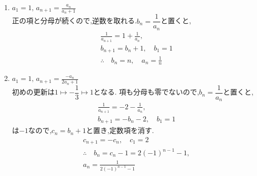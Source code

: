     \noindent{}\par\nobreak
    \begin{enumerate}[label=(\arabic*),parsep=3pt,format=\bookitemlink{example-reciprocal-1}{solution}{problem}]
      \item $\displaystyle a_1=1,\, a_{n+1}=\frac{a_n}{a_n+1}$\\
            正の項と分母が続くので,逆数を取れる.$b_n=\dfrac{1}{a_n}$と置くと,
            \begin{align*}
              &\frac{1}{a_{n+1}}=1+\frac{1}{a_n},\\
              &b_{n+1}=b_n+1,\quad b_1=1\\
              &\therefore \quad b_n=n,\quad a_n=\frac1n
            \end{align*}
      \item $\displaystyle a_1=1,\, a_{n+1}=\frac{-a_n}{2a_n+1}$\\
            初めの更新は$1\longmapsto-\dfrac{1}{3}\longmapsto1$となる.
            項も分母も零でないので,$b_n=\dfrac{1}{a_n}$と置くと,
            \begin{align*}
              &\frac{1}{a_{n+1}}=-2-\frac{1}{a_n},\\
              &b_{n+1}=-b_n-2,\quad b_1=1
            \end{align*}
            は$-1$なので,$c_n=b_n+1$と置き,定数項を消す.
            \begin{align*}
              &c_{n+1}=-c_n,\quad c_1=2\\
              &\therefore \quad b_n=c_n-1=2(-1)^{n-1}-1,\\
              &a_n=\frac{1}{2(-1)^{n-1}-1}
            \end{align*}
    \end{enumerate}

